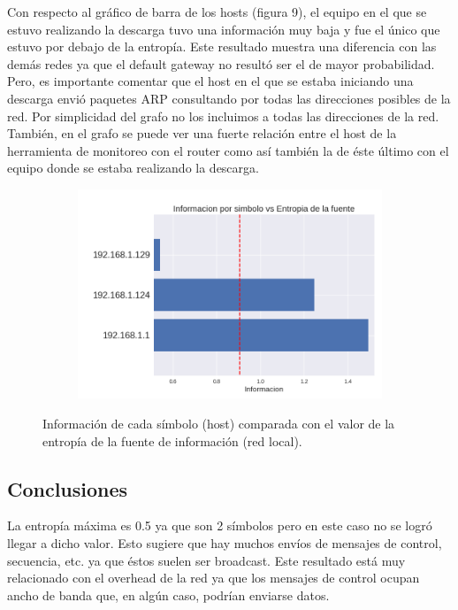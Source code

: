 \par Con respecto al gráfico de barra de los hosts (figura 9), el equipo en el que se estuvo realizando la descarga tuvo una información muy baja y fue el único que estuvo por debajo de la entropía. Este resultado muestra una diferencia con las demás redes ya que el default gateway no resultó ser el de mayor probabilidad. Pero, es importante comentar que el host en el que se estaba iniciando una descarga envió paquetes ARP consultando por todas las direcciones posibles de la red. Por simplicidad del grafo no los incluimos a todas las direcciones de la red. También, en el grafo se puede ver una fuerte relación entre el host de la herramienta de monitoreo con el router como así también la de éste último con el equipo donde se estaba realizando la descarga.

\begin{figure}[h]
  \begin{subfigure}{.5\textwidth}
    \includegraphics[width=\textwidth]{imagenes/mini_red/mini_red_hosts.png}
  \end{subfigure}
  \label{fig:exp3_hosts_infovsentro}
  \caption{Información de cada símbolo (host) comparada con el valor de la entropía de la fuente de información (red local).}
\end{figure}

\subsection{Conclusiones}

\par La entropía máxima es 0.5 ya que son 2 símbolos pero en este caso no se logró llegar a dicho valor. Esto sugiere que hay muchos envíos de mensajes de control, secuencia, etc. ya que éstos suelen ser broadcast. Este resultado está muy relacionado con el overhead de la red ya que los mensajes de control ocupan ancho de banda que, en algún caso, podrían enviarse datos.

